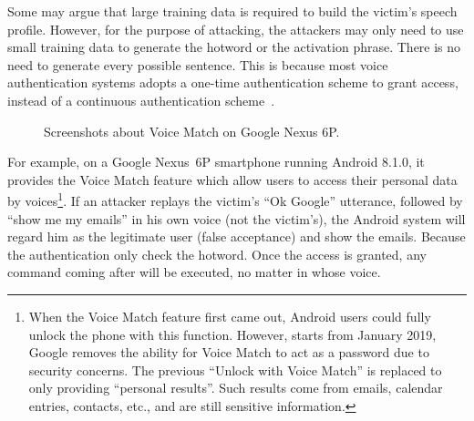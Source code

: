 Some may argue that large training data is required to build the victim's speech profile. However, for the purpose of attacking, the attackers may only need to use small training data to generate the hotword or the activation phrase. There is no need to generate every possible sentence. This is because most voice authentication systems adopts a one-time authentication scheme to grant access, instead of a continuous authentication scheme~\cite{feng2017continuous}.

\begin{landscape}
	\begin{figure*}[h]
		\begin{minipage}[t]{0.33\textwidth}
			\label{fig:voicematch}
		\end{minipage}
		\hspace{1in}
		\begin{minipage}[t]{0.33\textwidth}
			\label{fig:voicematch2}
		\end{minipage}
		\hspace{1in}
		\begin{minipage}[t]{0.33\textwidth}
			\label{fig:email}
		\end{minipage}  
	\vspace{-.05in}
		\caption{Screenshots about Voice Match on Google Nexus 6P.}\label{fig:example}
	\end{figure*}
\end{landscape}

For example, on a Google Nexus~6P smartphone running Android 8.1.0, it provides the Voice Match feature which allow users to access their personal data by voices\footnote{When the Voice Match feature first came out, Android users could fully unlock the phone with this function. However, starts from January 2019, Google removes the ability for Voice Match to act as a password due to security concerns. The previous ``Unlock with Voice Match'' is replaced to only providing ``personal results''. Such results come from emails, calendar entries, contacts, etc., and are still sensitive information.}. If an attacker replays the victim's ``Ok Google'' utterance, followed by ``show me my emails'' in his own voice (not the victim's), the Android system will regard him as the legitimate user (false acceptance) and show the emails. Because the authentication only check the hotword. Once the access is granted, any command coming after will be executed, no matter in whose voice.


